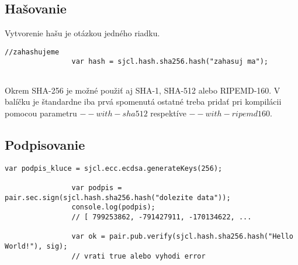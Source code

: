 		\subsection{Hašovanie}
		
			Vytvorenie hašu je otázkou jedného riadku.
			\medskip
			\begin{lstlisting}[caption=Hašovanie]
				//zahashujeme
				var hash = sjcl.hash.sha256.hash("zahasuj ma");
		
			\end{lstlisting}	
			
			Okrem SHA-256 je možné použiť aj SHA-1, SHA-512 alebo RIPEMD-160. V balíčku je štandardne iba prvá spomenutá ostatné treba pridať pri kompilácii pomocou parametru $--with-sha512$ respektíve $--with-ripemd160$.
			 
		\subsection{Podpisovanie}
	
			\medskip
			\begin{lstlisting}[caption=Podpisovanie]
				var podpis_kluce = sjcl.ecc.ecdsa.generateKeys(256);
		
				var podpis = pair.sec.sign(sjcl.hash.sha256.hash("dolezite data"));
				console.log(podpis);
				// [ 799253862, -791427911, -170134622, ...

				var ok = pair.pub.verify(sjcl.hash.sha256.hash("Hello World!"), sig);
				// vrati true alebo vyhodi error
			\end{lstlisting}	


